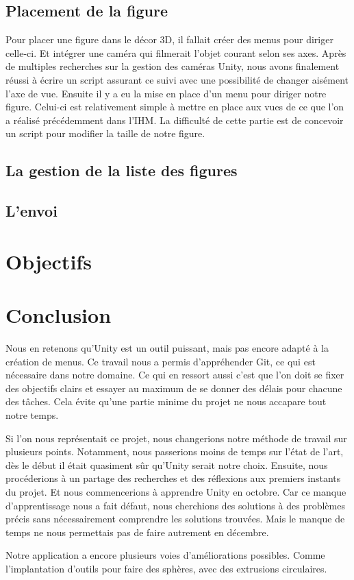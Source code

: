 \documentclass[a4paper,11pt]{article}
\begin{document}
		\subsection{Placement de la figure}
		
			Pour placer une figure dans le décor 3D, il fallait créer des menus pour diriger celle-ci. Et intégrer une caméra qui filmerait l'objet courant selon ses axes. Après de multiples recherches sur la gestion des caméras Unity, nous avons finalement réussi à écrire un script assurant ce suivi avec une possibilité de changer aisément l'axe de vue. Ensuite il y a eu la mise en place d'un menu pour diriger notre figure. Celui-ci est relativement simple à mettre en place aux vues de ce que l'on a réalisé précédemment dans l'IHM. La difficulté de cette partie est de concevoir un script pour modifier la taille de notre figure.

		\subsection{La gestion de la liste des figures}
		\subsection{L'envoi}
	\section{Objectifs}
	\section{Conclusion}
			Nous en retenons qu'Unity est un outil puissant, mais pas encore adapté à la création de menus. Ce travail nous a permis d'appréhender Git, ce qui est nécessaire dans notre domaine. Ce qui en ressort aussi c'est que l'on doit se fixer des objectifs clairs et essayer au maximum de se donner des délais pour chacune des tâches. Cela évite qu'une partie minime du projet ne nous accapare tout notre temps.
			
			Si l'on nous représentait ce projet, nous changerions notre méthode de travail sur plusieurs points. Notamment, nous passerions moins de temps sur l'état de l'art, dès le début il était quasiment sûr qu'Unity serait notre choix. Ensuite, nous procéderions à un partage des recherches et des réflexions aux premiers instants du projet. Et nous commencerions à apprendre Unity en octobre. Car ce manque d'apprentissage nous a fait défaut, nous cherchions des solutions à des problèmes précis sans nécessairement comprendre les solutions trouvées. Mais le manque de temps ne nous permettais pas de faire autrement en décembre.
			
			Notre application a encore plusieurs voies d'améliorations possibles. Comme l'implantation d'outils pour faire des sphères, avec des extrusions circulaires.
	
\end{document}
